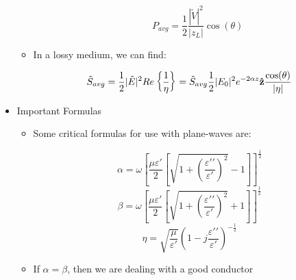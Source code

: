 \begin{itemize}
\begin{itemize}
\begin{itemize}
            $$P_{avg}=\frac{1}{2}\frac{|\tilde{V}|^2}{|z_L|}\cos(\theta)$$

        \end{itemize}

      \item In a lossy medium, we can find:

        $$\tilde{S}_{avg}=\frac{1}{2}|\tilde{E}|^2Re\left\{ \frac{1}{\eta} \right\}=\tilde{S}_{avg}\frac{1}{2}|E_0|^2e^{-2\alpha z}\bold{\hat{z}}\frac{\cos(\theta)}{|\eta|}$$

    \end{itemize}

  \item Important Formulas

    \begin{itemize}

      \item Some critical formulas for use with plane-waves are:

        $$\alpha=\omega\left[ \frac{\mu\varepsilon\prime}{2}\left[\sqrt{1+\left(\frac{\varepsilon\prime\prime}{\varepsilon\prime}\right)^2} -1\right]\right]^\frac{1}{2}$$
        $$\beta=\omega\left[ \frac{\mu\varepsilon\prime}{2}\left[\sqrt{1+\left(\frac{\varepsilon\prime\prime}{\varepsilon\prime}\right)^2} +1\right]\right]^\frac{1}{2}$$
        $$\eta=\sqrt{\frac{\mu}{\varepsilon\prime}}\left( 1-j\frac{\varepsilon\prime\prime}{\varepsilon\prime} \right)^{-\frac{1}{2}}$$

      \item If $\alpha=\beta$, then we are dealing with a good conductor

    \end{itemize}

\end{itemize}




